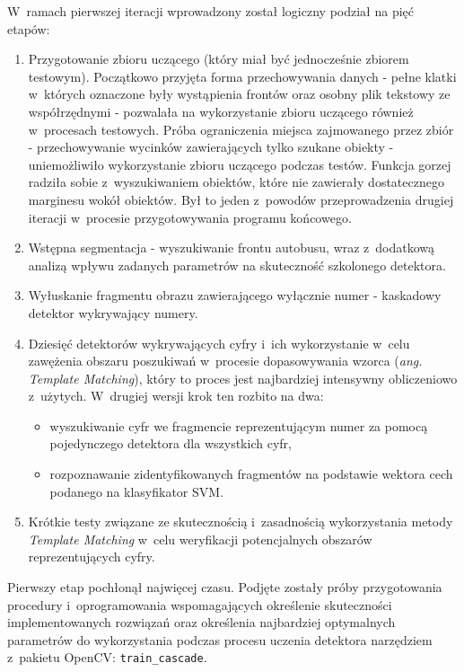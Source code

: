W~ramach pierwszej iteracji
wprowadzony został logiczny podział na pięć etapów:

\begin{enumerate}
    \item Przygotowanie zbioru uczącego (który miał być jednocześnie
        zbiorem testowym). Początkowo przyjęta forma przechowywania danych
        - pełne klatki w~których oznaczone były wystąpienia
        frontów oraz osobny plik tekstowy ze współrzędnymi -
        pozwalała na wykorzystanie zbioru uczącego również
        w~procesach testowych. 
        Próba ograniczenia miejsca zajmowanego przez zbiór -
        przechowywanie wycinków
        zawierających tylko szukane obiekty - 
        uniemożliwiło wykorzystanie zbioru uczącego podczas 
        testów. Funkcja
        gorzej radziła sobie z~wyszukiwaniem obiektów, które nie
        zawierały dostatecznego marginesu wokół obiektów.
        Był to jeden z~powodów przeprowadzenia drugiej iteracji
        w~procesie przygotowywania programu końcowego.
    \item Wstępna segmentacja - wyszukiwanie frontu autobusu, wraz
        z~dodatkową analizą wpływu zadanych parametrów na skuteczność
        szkolonego detektora.
    \item Wyłuskanie fragmentu obrazu zawierającego wyłącznie numer -
        kaskadowy detektor wykrywający numery.
    \item Dziesięć detektorów wykrywających cyfry i~ich wykorzystanie
        w~celu zawężenia obszaru poszukiwań w~procesie dopasowywania 
        wzorca (\textit{ang. Template Matching}), który to proces
        jest najbardziej intensywny obliczeniowo z~użytych.
        W~drugiej wersji krok ten rozbito na dwa:
        \begin{itemize}
            \item wyszukiwanie cyfr we fragmencie reprezentującym numer
                za pomocą pojedynczego detektora dla wszystkich cyfr,
            \item rozpoznawanie zidentyfikowanych fragmentów na
                podstawie wektora cech podanego na klasyfikator SVM.
        \end{itemize}
    \item Krótkie testy związane ze skutecznością i~zasadnością
        wykorzystania metody \textit{Template Matching} w~celu weryfikacji
        potencjalnych obszarów reprezentujących cyfry.
\end{enumerate}

Pierwszy etap pochłonął najwięcej czasu. Podjęte zostały próby 
przygotowania procedury i~oprogramowania wspomagających określenie
skuteczności implementowanych rozwiązań oraz określenia 
najbardziej optymalnych parametrów do wykorzystania podczas procesu
uczenia detektora narzędziem z~pakietu OpenCV: \verb|train_cascade|.

